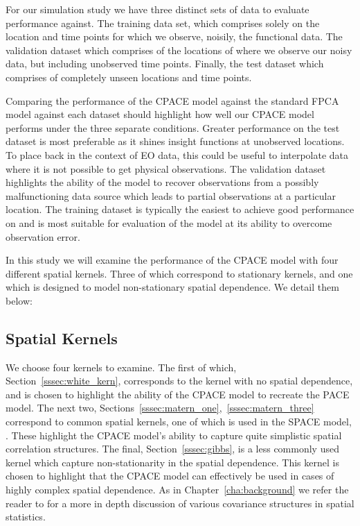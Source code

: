 For our simulation study we have three distinct sets of data to evaluate performance against.
The training data set, which comprises solely on the location and time points for which we observe, noisily, the functional data.
The validation dataset which comprises of the locations of where we observe our noisy data, but including unobserved time points. 
Finally, the test dataset which comprises of completely unseen locations and time points.

Comparing the performance of the CPACE model against the standard FPCA model against each dataset should highlight how well our CPACE model performs under the three separate conditions.
Greater performance on the test dataset is most preferable as it shines insight functions at unobserved locations.
To place back in the context of EO data, this could be useful to interpolate data where it is not possible to get physical observations.
The validation dataset highlights the ability of the model to recover observations from a possibly malfunctioning data source which leads to partial observations at a particular location.
The training dataset is typically the easiest to achieve good performance on and is most suitable for evaluation of the model at its ability to overcome observation error.

In this study we will examine the performance of the CPACE model with four different spatial kernels. Three of which correspond to stationary kernels, and one which is designed to model non-stationary spatial dependence. We detail them below: 

\subsection{Spatial Kernels  \label{ssec:spatial_kern}}
We choose four kernels to examine. The first of which, Section~\ref{sssec:white_kern}, corresponds to the kernel with no spatial dependence, and is chosen to highlight the ability of the CPACE model to recreate the PACE model. The next two, Sections~\ref{sssec:matern_one},~\ref{sssec:matern_three} correspond to common spatial kernels, one of which is used in the SPACE model, \citep{liu_functional_2017}. These highlight the CPACE model's ability to capture quite simplistic spatial correlation structures. The final, Section~\ref{sssec:gibbs}, is a less commonly used kernel which capture non-stationarity in the spatial dependence. This kernel is chosen to highlight that the CPACE model can effectively be used in cases of highly complex spatial dependence. As in Chapter~\ref{cha:background} we refer the reader to \cite{cressie_statistics_2011} for a more in depth discussion of various covariance structures in spatial statistics.

